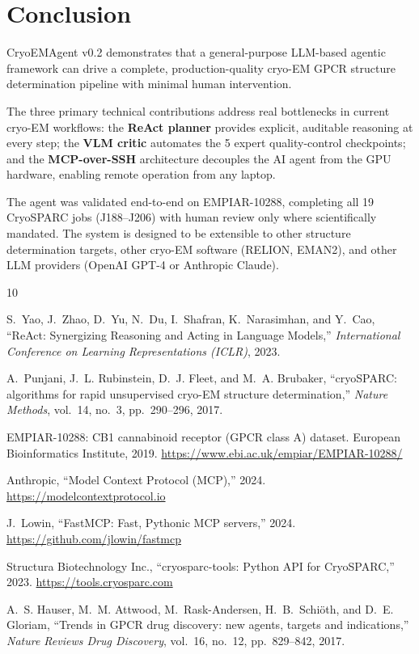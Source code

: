 \documentclass[12pt, a4paper]{article}
\begin{document}
\section{Conclusion}
\label{sec:conclusion}

CryoEMAgent v0.2 demonstrates that a general-purpose LLM-based agentic
framework can drive a complete, production-quality cryo-EM GPCR structure
determination pipeline with minimal human intervention.

The three primary technical contributions address real bottlenecks in current
cryo-EM workflows:
the \textbf{ReAct planner} provides explicit, auditable reasoning at every
step;
the \textbf{VLM critic} automates the 5 expert quality-control checkpoints;
and the \textbf{MCP-over-SSH} architecture decouples the AI agent from the
GPU hardware, enabling remote operation from any laptop.

The agent was validated end-to-end on EMPIAR-10288, completing all 19
CryoSPARC jobs (J188--J206) with human review only where scientifically
mandated.
The system is designed to be extensible to other structure determination
targets, other cryo-EM software (RELION, EMAN2), and other LLM providers
(OpenAI GPT-4 or Anthropic Claude).

\begin{thebibliography}{10}

S.~Yao, J.~Zhao, D.~Yu, N.~Du, I.~Shafran, K.~Narasimhan, and Y.~Cao,
``ReAct: Synergizing Reasoning and Acting in Language Models,''
\textit{International Conference on Learning Representations (ICLR)}, 2023.

A.~Punjani, J.~L. Rubinstein, D.~J. Fleet, and M.~A. Brubaker,
``cryoSPARC: algorithms for rapid unsupervised cryo-EM structure
determination,''
\textit{Nature Methods}, vol.~14, no.~3, pp.~290--296, 2017.

EMPIAR-10288: CB1 cannabinoid receptor (GPCR class A) dataset.
European Bioinformatics Institute, 2019.
\url{https://www.ebi.ac.uk/empiar/EMPIAR-10288/}

Anthropic, ``Model Context Protocol (MCP),'' 2024.
\url{https://modelcontextprotocol.io}

J.~Lowin, ``FastMCP: Fast, Pythonic MCP servers,'' 2024.
\url{https://github.com/jlowin/fastmcp}

Structura Biotechnology Inc., ``cryosparc-tools: Python API for
CryoSPARC,'' 2023.
\url{https://tools.cryosparc.com}

A.~S. Hauser, M.~M. Attwood, M.~Rask-Andersen, H.~B.~Schi\"oth, and
D.~E. Gloriam,
``Trends in GPCR drug discovery: new agents, targets and indications,''
\textit{Nature Reviews Drug Discovery}, vol.~16, no.~12,
pp.~829--842, 2017.

\end{thebibliography}
\end{document}
